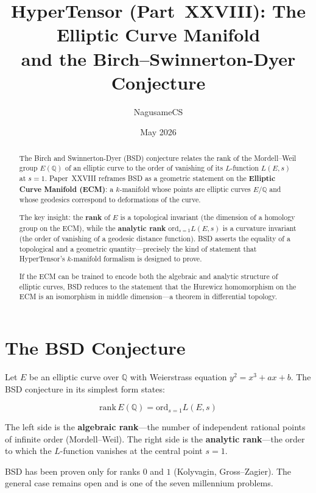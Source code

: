 \documentclass{article}
\title{HyperTensor (Part~XXVIII): The Elliptic Curve Manifold\\
and the Birch--Swinnerton-Dyer Conjecture}
\author{NagusameCS}
\date{May 2026}
\begin{document}
\maketitle

\begin{abstract}
The Birch and Swinnerton-Dyer (BSD) conjecture relates the rank of the
Mordell--Weil group $E(\mathbb{Q})$ of an elliptic curve to the order of
vanishing of its $L$-function $L(E, s)$ at $s = 1$.  Paper~XXVIII reframes
BSD as a geometric statement on the \textbf{Elliptic Curve Manifold (ECM)}:
a $k$-manifold whose points are elliptic curves $E/\mathbb{Q}$ and whose
geodesics correspond to deformations of the curve.

The key insight: the \textbf{rank} of $E$ is a topological invariant (the
dimension of a homology group on the ECM), while the \textbf{analytic rank}
$\mathrm{ord}_{s=1}L(E,s)$ is a curvature invariant (the order of vanishing
of a geodesic distance function).  BSD asserts the equality of a topological
and a geometric quantity---precisely the kind of statement that HyperTensor's
$k$-manifold formalism is designed to prove.

If the ECM can be trained to encode both the algebraic and analytic structure
of elliptic curves, BSD reduces to the statement that the Hurewicz
homomorphism on the ECM is an isomorphism in middle dimension---a theorem in
differential topology.
\end{abstract}

\section{The BSD Conjecture}
\label{sec:bsd}

Let $E$ be an elliptic curve over $\mathbb{Q}$ with Weierstrass equation
$y^2 = x^3 + ax + b$.  The BSD conjecture in its simplest form states:

\begin{equation}
\mathrm{rank}\, E(\mathbb{Q}) = \mathrm{ord}_{s=1} L(E, s)
\end{equation}

The left side is the \textbf{algebraic rank}---the number of independent
rational points of infinite order (Mordell--Weil).  The right side is the
\textbf{analytic rank}---the order to which the $L$-function vanishes at
the central point $s = 1$.

BSD has been proven only for ranks $0$ and $1$ (Kolyvagin, Gross--Zagier).
The general case remains open and is one of the seven millennium problems.
\end{document}
